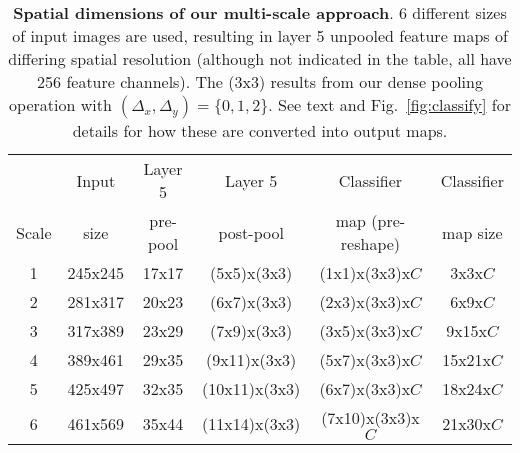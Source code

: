 \documentclass{article} %
\newcommand{\fig}[1]{Fig.~\ref{fig:#1}}
\begin{document}
\begin{table}[h!]
\small
\begin{center}
\begin{tabular}{|c||c|c|c|c||c|}
  \hline  
        & Input & Layer 5 & Layer 5 & Classifier & Classifier \\ 
  Scale & size  & pre-pool & post-pool& map (pre-reshape) & map size \\ \hline \hline
  1     & 245x245 & 17x17 & (5x5)x(3x3)  & (1x1)x(3x3)x$C$ & 3x3x$C$ \\ \hline
  2     & 281x317 & 20x23 & (6x7)x(3x3) & (2x3)x(3x3)x$C$ & 6x9x$C$ \\ \hline
  3     & 317x389 & 23x29 & (7x9)x(3x3) & (3x5)x(3x3)x$C$ & 9x15x$C$ \\ \hline
  4     & 389x461 & 29x35 & (9x11)x(3x3) & (5x7)x(3x3)x$C$ & 15x21x$C$ \\ \hline
  5     & 425x497 & 32x35 & (10x11)x(3x3)  & (6x7)x(3x3)x$C$ & 18x24x$C$ \\ \hline
  6     & 461x569 & 35x44 & (11x14)x(3x3) & (7x10)x(3x3)x$C$ & 21x30x$C$ \\ \hline
\end{tabular}
\vspace*{2mm}
\caption{\textbf{Spatial dimensions of our multi-scale approach}. 6 different
  sizes of input images are used, resulting in layer 5 unpooled
  feature maps of differing spatial resolution (although not indicated
  in the table, all have 256 feature channels). The (3x3) results from
  our dense pooling operation with $(\Delta_x,\Delta_y)=\{0,1,2\}$. See text and
  \fig{classify} for details for how these are converted into output
  maps.}
\label{tab:multiscale}
\end{center}
\end{table}
\end{document}
